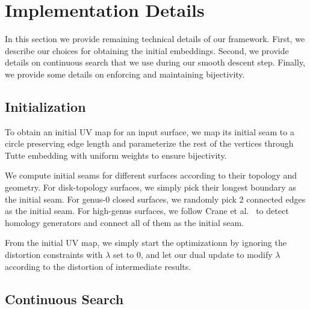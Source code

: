 
\section{Implementation Details}
\label{sec:imp}

In this section we provide remaining technical details of our framework. First, we describe our choices for obtaining the initial embeddings. Second, we provide details on continuous search that we use during our smooth descent step. Finally, we provide some details on enforcing and maintaining bijectivity. 

\subsection{Initialization}
To obtain an initial UV map for an input surface, we map its initial seam to a circle preserving edge length and parameterize the rest of the vertices through Tutte embedding with uniform weights to ensure bijectivity.

We compute initial seams for different surfaces according to their topology and geometry. For disk-topology surfaces, we simply pick their longest boundary as the initial seam. For genus-0 closed surfaces, we randomly pick 2 connected edges as the initial seam. For high-genus surfaces, we follow Crane et al.~ to detect homology generators and connect all of them as the initial seam.

From the initial UV map, we simply start the optimizationn by ignoring the distortion constraints with $\lambda$ set to $0$, and let our dual update to modify $\lambda$ according to the distortion of intermediate results.


\subsection{Continuous Search}
\label{sec:descentStep}

